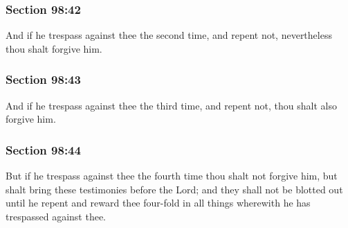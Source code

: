 	\subsubsection{Section 98:42} %
		\label{DC98-42}

		And if he trespass against thee the second time, and repent not, nevertheless thou shalt forgive him.


	\subsubsection{Section 98:43} %
		\label{DC98-43}

		And if he trespass against thee the third time, and repent not, thou shalt also forgive him.


	\subsubsection{Section 98:44} %
		\label{DC98-44}

		But if he trespass against thee the fourth time thou shalt not forgive him, but shalt bring these testimonies before the Lord; and they shall not be blotted out until he repent and reward thee four-fold in all things wherewith he has trespassed against thee.


